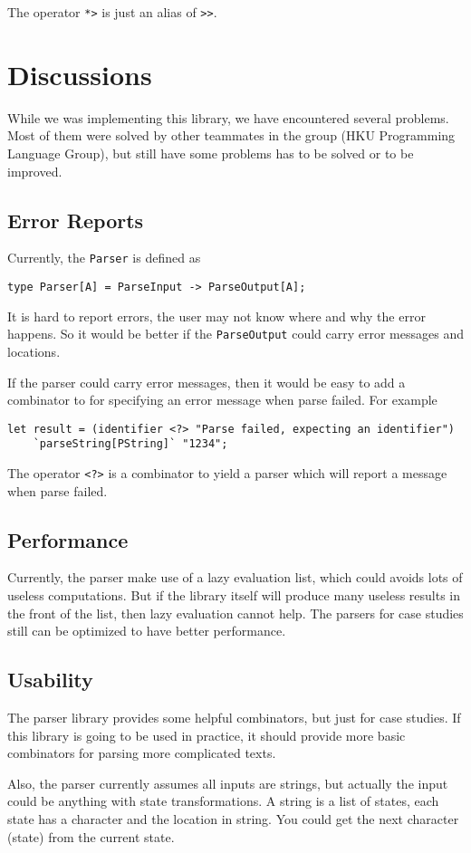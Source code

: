 The operator \texttt{*>} is just an alias of \texttt{>>}.

\section{Discussions}

While we was implementing this library, we have encountered several problems. Most of them were solved by other teammates in the group (HKU Programming Language Group), but still have some problems has to be solved or to be improved.

\subsection{Error Reports}

Currently, the \texttt{Parser} is defined as

\begin{lstlisting}
type Parser[A] = ParseInput -> ParseOutput[A];
\end{lstlisting}

It is hard to report errors, the user may not know where and why the error happens. So it would be better if the \texttt{ParseOutput} could carry error messages and locations.

If the parser could carry error messages, then it would be easy to add a combinator to for specifying an error message when parse failed. For example

\begin{lstlisting}
let result = (identifier <?> "Parse failed, expecting an identifier")
    `parseString[PString]` "1234";
\end{lstlisting}

The operator \texttt{\textless?\textgreater} is a combinator to yield a parser which will report a message when parse failed.

\subsection{Performance}

Currently, the parser make use of a lazy evaluation list, which could avoids lots of useless computations. But if the library itself will produce many useless results in the front of the list, then lazy evaluation cannot help. The parsers for case studies still can be optimized to have better performance.

\subsection{Usability}

The parser library provides some helpful combinators, but just for case studies. If this library is going to be used in practice, it should provide more basic combinators for parsing more complicated texts.

Also, the parser currently assumes all inputs are strings, but actually the input could be anything with state transformations. A string is a list of states, each state has a character and the location in string. You could get the next character (state) from the current state.
